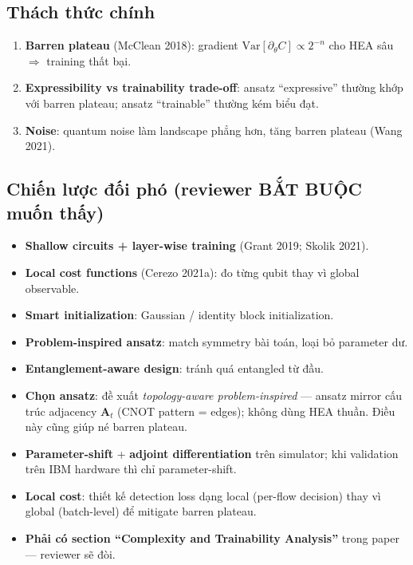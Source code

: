 \documentclass[11pt,a4paper]{article}
\begin{document}
\subsection{Thách thức chính}

\begin{warn}
\begin{enumerate}
  \item \textbf{Barren plateau} (McClean 2018): gradient $\mathrm{Var}[\partial_\theta C] \propto 2^{-n}$ cho HEA sâu $\Rightarrow$ training thất bại.
  \item \textbf{Expressibility vs trainability trade-off}: ansatz ``expressive'' thường khớp với barren plateau; ansatz ``trainable'' thường kém biểu đạt.
  \item \textbf{Noise}: quantum noise làm landscape phẳng hơn, tăng barren plateau (Wang 2021).
\end{enumerate}
\end{warn}

\subsection{Chiến lược đối phó (reviewer BẮT BUỘC muốn thấy)}
\begin{itemize}
  \item \textbf{Shallow circuits + layer-wise training} (Grant 2019; Skolik 2021).
  \item \textbf{Local cost functions} (Cerezo 2021a): đo từng qubit thay vì global observable.
  \item \textbf{Smart initialization}: Gaussian / identity block initialization.
  \item \textbf{Problem-inspired ansatz}: match symmetry bài toán, loại bỏ parameter dư.
  \item \textbf{Entanglement-aware design}: tránh quá entangled từ đầu.
\end{itemize}

\begin{take}
\begin{itemize}
  \item \textbf{Chọn ansatz}: đề xuất \textit{topology-aware problem-inspired} --- ansatz mirror cấu trúc adjacency $\mathbf{A}_t$ (CNOT pattern = edges); không dùng HEA thuần. Điều này cũng giúp né barren plateau.
  \item \textbf{Parameter-shift} + \textbf{adjoint differentiation} trên simulator; khi validation trên IBM hardware thì chỉ parameter-shift.
  \item \textbf{Local cost}: thiết kế detection loss dạng local (per-flow decision) thay vì global (batch-level) để mitigate barren plateau.
  \item \textbf{Phải có section ``Complexity and Trainability Analysis''} trong paper --- reviewer sẽ đòi.
\end{itemize}
\end{take}
\end{document}

